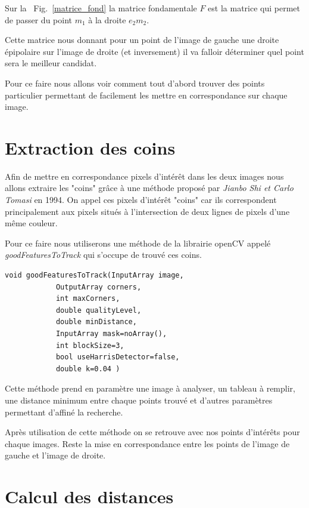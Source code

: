 \documentclass[a4paper,10pt]{article}
\begin{document}
Sur la ~Fig.~\ref{matrice_fond}  la matrice fondamentale $F$ est la matrice qui permet de passer du point $m_1$ \`a la droite $e_2m_2$.

Cette matrice nous donnant pour un point de l'image de gauche une droite \'epipolaire sur l'image de droite (et inversement) il va falloir d\'eterminer quel point sera le meilleur candidat.

Pour ce faire nous allons voir comment tout d'abord trouver des points particulier permettant de facilement les mettre en correspondance sur chaque image.

\section{Extraction des coins}

Afin de mettre en correspondance pixels d'int\'er\^et dans les deux images nous allons extraire les "coins" gr\^ace \`a une m\'ethode propos\'e par \emph{Jianbo Shi et Carlo Tomasi} en 1994. On appel ces pixels d'int\'er\^et "coins" car ils correspondent principalement aux pixels situ\'es \`a l'intersection de deux lignes de pixels d'une m\^eme couleur.

Pour ce faire nous utiliserons une m\'ethode de la librairie openCV appel\'e \emph{goodFeaturesToTrack} qui s'occupe de trouv\'e ces coins.

\begin{Verbatim}[commandchars=\\\{\}]
void goodFeaturesToTrack(InputArray image, 
			OutputArray corners, 
			int maxCorners, 
			double qualityLevel, 
			double minDistance, 
			InputArray mask=noArray(), 
			int blockSize=3, 
			bool useHarrisDetector=false, 
			double k=0.04 )
\end{Verbatim}

Cette m\'ethode prend en param\`etre une image \`a analyser, un tableau \`a remplir, une distance minimum entre chaque points trouv\'e et d'autres param\`etres permettant d'affin\'e la recherche.

Apr\`es utilisation de cette m\'ethode on se retrouve avec nos points d'int\'er\^ets pour chaque images. Reste la mise en correspondance entre les points de l'image de gauche et l'image de droite.

\section{Calcul des distances}
\end{document}
